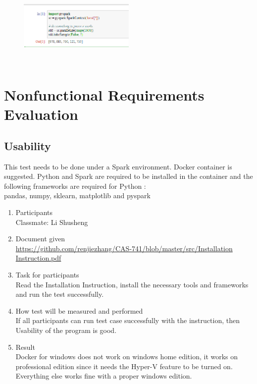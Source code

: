 \documentclass[12pt, titlepage]{article}
\begin{document}
\begin{figure}[h!]
\begin{center}
{
\includegraphics[width=0.5\textwidth]{sparktest.png}
}
\caption{\label{Spark}}
\end{center}
\end{figure}
~\newline




\section{Nonfunctional Requirements Evaluation}

\subsection{Usability}
This test needs to be done under a Spark environment. Docker container is suggested. 
Python and Spark are required to be installed in the container and the following frameworks are required for Python :\\ 
pandas, numpy, sklearn, matplotlib and pyspark\\

\begin{enumerate}
\item{Participants\\}
Classmate: Li Shusheng 
\item{Document given\\}
\url{https://github.com/renjiezhang/CAS-741/blob/master/src/Installation Instruction.pdf}
\item{Task for participants\\}
Read the Installation Instruction, install the necessary tools and frameworks and run the test successfully. 
\item{How test will be measured and performed\\}
If all participants can run test case successfully with the instruction, then Usability of the program is good.
\item{Result\\} Docker for windows does not work on windows home edition, it works on professional edition since it needs the Hyper-V feature to be turned on. Everything else works fine with a proper windows edition.
\end{enumerate}
\end{document}
